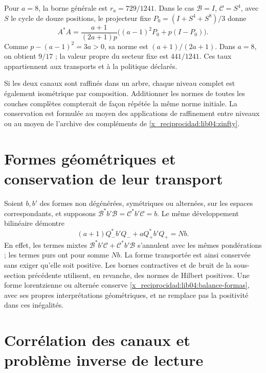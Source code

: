 Pour \(a=8\), la borne générale est \(r_a=729/1241\). Dans le cas \(\mathcal B=I\), \(\mathcal C=S^4\), avec \(S\) le cycle de douze positions, le projecteur fixe \(P_0=(I+S^4+S^8)/3\) donne
\begin{equation}
 A^*A=\frac{a+1}{(2a+1)p}
       \bigl((a-1)^2P_0+p(I-P_0)\bigr).
 \label{x_reciprocidad:lib04:gram-tasa-ternaria}
\end{equation}
Comme \(p-(a-1)^2=3a>0\), sa norme est
\((a+1)/(2a+1)\). Dans \(a=8\), on obtient \(9/17\) ; la valeur propre
du secteur fixe est \(441/1241\). Ces taux appartiennent aux
transports et à la politique déclarés.

Si les deux canaux sont raffinés dans un arbre, chaque niveau complet est également isométrique par composition. Additionner les normes de toutes les couches complètes compterait de façon répétée la même norme initiale. La conservation est formulée au moyen des applications de raffinement entre niveaux ou au moyen de l'archive des compléments de \eqref{x_reciprocidad:lib04:zinfty}.

\section{Formes géométriques et conservation de leur transport}
\label{x_reciprocidad:lib04:formas}

Soient \(b,b'\) des formes non dégénérées, symétriques ou alternées, sur
les espaces correspondants, et supposons
\(\mathcal B^*b'\mathcal B=\mathcal C^*b'\mathcal C=b\).
Le même développement bilinéaire démontre
\begin{equation}
 (a+1)Q_-^*b'Q_-+aQ_+^*b'Q_+=Nb.
 \label{x_reciprocidad:lib04:balance-formas}
\end{equation}
En effet, les termes mixtes
\(\mathcal B^*b'\mathcal C+\mathcal C^*b'\mathcal B\) s’annulent
avec les mêmes pondérations ; les termes purs ont pour somme \(Nb\).
La forme transportée est ainsi conservée sans exiger qu’elle soit positive.
Les bornes contractives et de bruit de la sous-section précédente utilisent,
en revanche, des normes de Hilbert positives. Une forme lorentzienne ou
alternée conserve \eqref{x_reciprocidad:lib04:balance-formas}, avec ses propres
interprétations géométriques, et ne remplace pas la positivité dans ces
inégalités.

\section{Corrélation des canaux et problème inverse de lecture}
\label{x_reciprocidad:lib04:correlacion}


